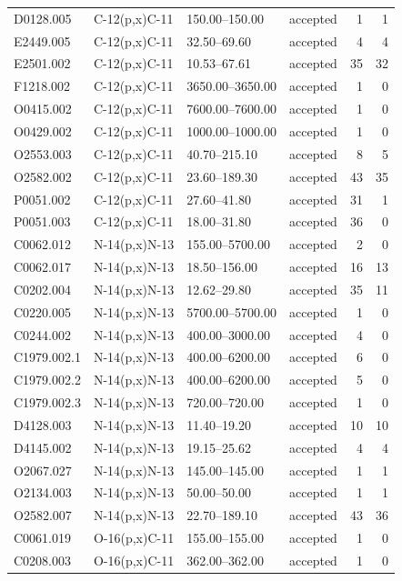\begin{longtable}{llllrr}
D0128.005 & C-12(p,x)C-11 & 150.00--150.00 & accepted & 1 & 1 \\
E2449.005 & C-12(p,x)C-11 & 32.50--69.60 & accepted & 4 & 4 \\
E2501.002 & C-12(p,x)C-11 & 10.53--67.61 & accepted & 35 & 32 \\
F1218.002 & C-12(p,x)C-11 & 3650.00--3650.00 & accepted & 1 & 0 \\
O0415.002 & C-12(p,x)C-11 & 7600.00--7600.00 & accepted & 1 & 0 \\
O0429.002 & C-12(p,x)C-11 & 1000.00--1000.00 & accepted & 1 & 0 \\
O2553.003 & C-12(p,x)C-11 & 40.70--215.10 & accepted & 8 & 5 \\
O2582.002 & C-12(p,x)C-11 & 23.60--189.30 & accepted & 43 & 35 \\
P0051.002 & C-12(p,x)C-11 & 27.60--41.80 & accepted & 31 & 1 \\
P0051.003 & C-12(p,x)C-11 & 18.00--31.80 & accepted & 36 & 0 \\
C0062.012 & N-14(p,x)N-13 & 155.00--5700.00 & accepted & 2 & 0 \\
C0062.017 & N-14(p,x)N-13 & 18.50--156.00 & accepted & 16 & 13 \\
C0202.004 & N-14(p,x)N-13 & 12.62--29.80 & accepted & 35 & 11 \\
C0220.005 & N-14(p,x)N-13 & 5700.00--5700.00 & accepted & 1 & 0 \\
C0244.002 & N-14(p,x)N-13 & 400.00--3000.00 & accepted & 4 & 0 \\
C1979.002.1 & N-14(p,x)N-13 & 400.00--6200.00 & accepted & 6 & 0 \\
C1979.002.2 & N-14(p,x)N-13 & 400.00--6200.00 & accepted & 5 & 0 \\
C1979.002.3 & N-14(p,x)N-13 & 720.00--720.00 & accepted & 1 & 0 \\
D4128.003 & N-14(p,x)N-13 & 11.40--19.20 & accepted & 10 & 10 \\
D4145.002 & N-14(p,x)N-13 & 19.15--25.62 & accepted & 4 & 4 \\
O2067.027 & N-14(p,x)N-13 & 145.00--145.00 & accepted & 1 & 1 \\
O2134.003 & N-14(p,x)N-13 & 50.00--50.00 & accepted & 1 & 1 \\
O2582.007 & N-14(p,x)N-13 & 22.70--189.10 & accepted & 43 & 36 \\
C0061.019 & O-16(p,x)C-11 & 155.00--155.00 & accepted & 1 & 0 \\
C0208.003 & O-16(p,x)C-11 & 362.00--362.00 & accepted & 1 & 0 \\

\end{longtable}
